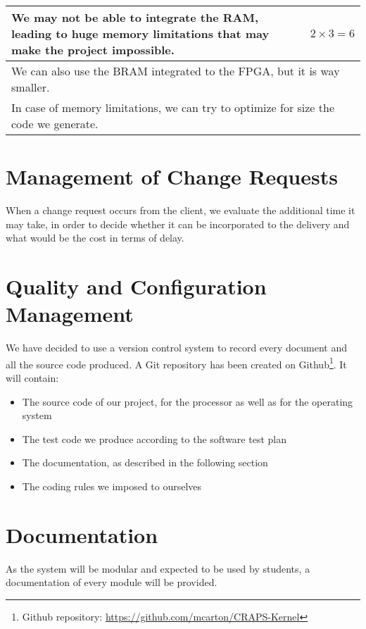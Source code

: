 \documentclass{article}
\begin{document}
    \begin{tabular}{|p{}|r|}\hline
        We may not be able to integrate the RAM, leading to huge memory limitations that may make the project impossible. & $2 \times 3 = 6$ \\ \hline
        \multicolumn{2}{|p{\textwidth}|}{We can also use the BRAM integrated to the FPGA, but it is way smaller.} \\ \hline
        \multicolumn{2}{|p{\textwidth}|}{In case of memory limitations, we can try to optimize for size the code we generate.} \\ \hline
    \end{tabular}

  \section{Management of Change Requests}
    When a change request occurs from the client, we evaluate the additional
    time it may take, in order to decide whether it can be incorporated to the
    delivery and what would be the cost in terms of delay.

  \section{Quality and Configuration Management}
    We have decided to use a version control system to record every document and
    all the source code produced. A Git repository has been created on
    Github\footnote{Github repository:
    \url{https://github.com/mcarton/CRAPS-Kernel}}.
    It will contain:
    \begin{itemize}
      \item The source code of our project, for the processor as well as for the
            operating system
      \item The test code we produce according to the software test plan
      \item The documentation, as described in the following section
      \item The coding rules we imposed to ourselves
    \end{itemize}

  \section{Documentation}
    As the system will be modular and expected to be used by students, a
    documentation of every module will be provided.
\end{document}
